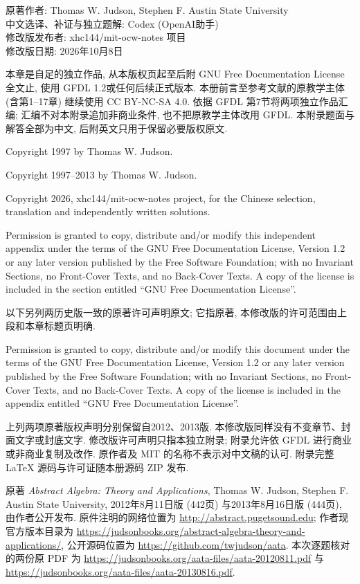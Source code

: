 \clearpage
{}
\label{ch:judson-independent}
\begin{center}
原著作者: Thomas W. Judson, Stephen F. Austin State University\\
中文选译、补证与独立题解: Codex (OpenAI助手)\\
修改版发布者: xhc144/mit-ocw-notes 项目\\
修改版日期: 2026年10月8日
\end{center}
本章是自足的独立作品, 从本版权页起至后附 GNU Free Documentation License 全文止, 使用 GFDL 1.2或任何后续正式版本. 本册前言至参考文献的原教学主体 (含第1--17章) 继续使用 CC BY-NC-SA 4.0. 依据 GFDL 第7节将两项独立作品汇编; 汇编不对本附录追加非商业条件, 也不把原教学主体改用 GFDL. 本附录题面与解答全部为中文, 后附英文只用于保留必要版权原文.

\noindent Copyright 1997 by Thomas W. Judson.\par
\noindent Copyright 1997--2013 by Thomas W. Judson.\par
\noindent Copyright 2026, xhc144/mit-ocw-notes project, for the Chinese selection, translation and independently written solutions.\par
\noindent Permission is granted to copy, distribute and/or modify this independent appendix under the terms of the GNU Free Documentation License, Version 1.2 or any later version published by the Free Software Foundation; with no Invariant Sections, no Front-Cover Texts, and no Back-Cover Texts. A copy of the license is included in the section entitled ``GNU Free Documentation License''.\par
以下另列两历史版一致的原著许可声明原文; 它指原著, 本修改版的许可范围由上段和本章标题页明确.\par
\noindent Permission is granted to copy, distribute and/or modify this document under the terms of the GNU Free Documentation License, Version 1.2 or any later version published by the Free Software Foundation; with no Invariant Sections, no Front-Cover Texts, and no Back-Cover Texts. A copy of the license is included in the appendix entitled ``GNU Free Documentation License''.\par
上列两项原著版权声明分别保留自2012、2013版. 本修改版同样没有不变章节、封面文字或封底文字. 修改版许可声明只指本独立附录; 附录允许依 GFDL 进行商业或非商业复制及改作. 原作者及 MIT 的名称不表示对中文稿的认可. 附录完整 LaTeX 源码与许可证随本册源码 ZIP 发布.

\par\addvspace{9pt}
\par
原著 \textit{Abstract Algebra: Theory and Applications}, Thomas W. Judson, Stephen F. Austin State University, 2012年8月11日版 (442页) 与2013年8月16日版 (444页), 由作者公开发布. 原件注明的网络位置为 \url{http://abstract.pugetsound.edu}; 作者现官方版本目录为 \url{https://judsonbooks.org/abstract-algebra-theory-and-applications/}, 公开源码位置为 \url{https://github.com/twjudson/aata}. 本次逐题核对的两份原 PDF 为 \url{https://judsonbooks.org/aata-files/aata-20120811.pdf} 与 \url{https://judsonbooks.org/aata-files/aata-20130816.pdf}.

